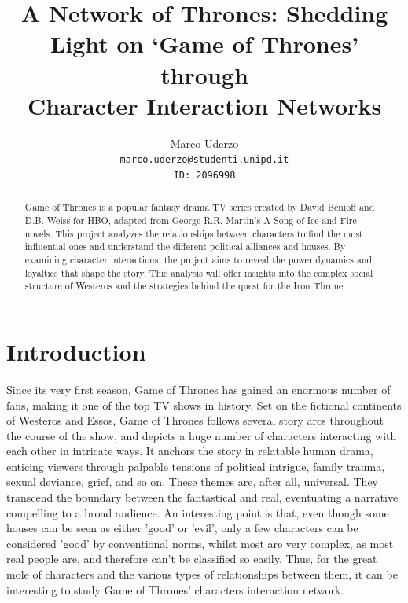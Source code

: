 \documentclass[10pt,twocolumn,letterpaper]{article}
\begin{document}
\title{A Network of Thrones: Shedding Light on `Game of Thrones' through \\Character Interaction Networks}

\author{Marco Uderzo\\
{\tt\small marco.uderzo@studenti.unipd.it} \\
{\tt\small ID: 2096998} \\
}


\maketitle

\begin{abstract}
Game of Thrones is a popular fantasy drama TV series created by David Benioff and D.B. Weiss for HBO, adapted from George R.R. Martin's A Song of Ice and Fire novels. This project analyzes the relationships between characters to find the most influential ones and understand the different political alliances and houses. By examining character interactions, the project aims to reveal the power dynamics and loyalties that shape the story. This analysis will offer insights into the complex social structure of Westeros and the strategies behind the quest for the Iron Throne.
\end{abstract}

\section{Introduction}

Since its very first season, Game of Thrones has gained an enormous number of fans, making it one of the top TV shows in history. Set on the fictional continents of Westeros and Essos, Game of Thrones follows several story arcs throughout the course of the show, and depicts a huge number of characters interacting with each other in intricate ways. It anchors the story in relatable human drama, enticing viewers through palpable tensions of political intrigue, family trauma, sexual deviance, grief, and so on. These themes are, after all, universal. They transcend the boundary between the fantastical and real, eventuating a narrative compelling to a broad audience. An interesting point is that, even though some houses can be seen as either 'good' or 'evil', only a few characters can be considered 'good' by conventional norms, whilst most are very complex, as most real people are, and therefore can't be classified so easily.
Thus, for the great mole of characters and the various types of relationships between them, it can be interesting to study Game of Thrones' characters interaction network.
\end{document}
